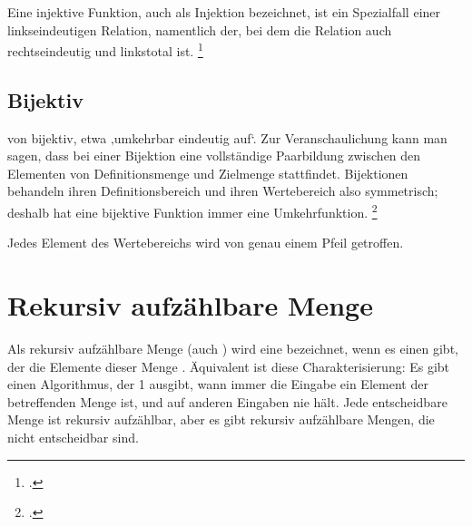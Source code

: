 \documentclass{bschlangaul-theorie}
\begin{document}
Eine injektive Funktion, auch als Injektion bezeichnet, ist ein
Spezialfall einer linkseindeutigen Relation, namentlich der, bei dem die
Relation auch rechtseindeutig und linkstotal ist.
\footcite{wiki:injektiv}

%

\subsection{Bijektiv}

von bijektiv, etwa ‚umkehrbar eindeutig auf‘. Zur Veranschaulichung kann
man sagen, dass bei einer Bijektion eine vollständige Paarbildung
zwischen den Elementen von Definitionsmenge und Zielmenge stattfindet.
Bijektionen behandeln ihren Definitionsbereich und ihren Wertebereich
also symmetrisch; deshalb hat eine bijektive Funktion immer eine
Umkehrfunktion.
\footcite{wiki:bijektiv}

Jedes Element des Wertebereichs wird von genau einem Pfeil getroffen.

\begin{center}
\end{center}

\section{Rekursiv aufzählbare Menge}

Als rekursiv aufzählbare Menge (auch )
wird eine  bezeichnet, wenn es einen
 gibt, der die Elemente dieser Menge
. Äquivalent ist diese Charakterisierung: Es gibt einen
Algorithmus, der 1 ausgibt, wann immer die Eingabe ein Element der
betreffenden Menge ist, und auf anderen Eingaben nie hält. Jede
entscheidbare Menge ist rekursiv aufzählbar, aber es gibt rekursiv
aufzählbare Mengen, die nicht entscheidbar sind.
\end{document}
